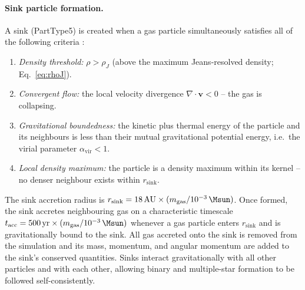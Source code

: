 \paragraph{Sink particle formation.}
A sink (PartType5) is created when a gas particle simultaneously satisfies
all of the following criteria \citep{Grudic2021}:
\begin{enumerate}
    \item \textit{Density threshold:} $\rho > \rho_J$ (above the
          maximum Jeans-resolved density; Eq.~\ref{eq:rhoJ}).
    \item \textit{Convergent flow:} the local velocity divergence
          $\nabla\cdot\mathbf{v} < 0$ -- the gas is collapsing.
    \item \textit{Gravitational boundedness:} the kinetic plus thermal
          energy of the particle and its neighbours is less than their
          mutual gravitational potential energy, i.e.\ the virial
          parameter $\alpha_\mathrm{vir} < 1$.
    \item \textit{Local density maximum:} the particle is a density
          maximum within its kernel -- no denser neighbour exists within
          $r_\mathrm{sink}$.
\end{enumerate}
The sink accretion radius is $r_\mathrm{sink} = 18\,\mathrm{AU}\times
(m_\mathrm{gas}/10^{-3}\,\Msun)$.  Once formed, the sink accretes
neighbouring gas on a characteristic timescale
$t_\mathrm{acc} = 500\,\mathrm{yr}\times(m_\mathrm{gas}/10^{-3}\,\Msun)$
whenever a gas particle enters $r_\mathrm{sink}$ and is gravitationally
bound to the sink.  All gas accreted onto the sink is removed from the
simulation and its mass, momentum, and angular momentum are added to the
sink's conserved quantities.  Sinks interact gravitationally with all other
particles and with each other, allowing binary and multiple-star formation
to be followed self-consistently.

